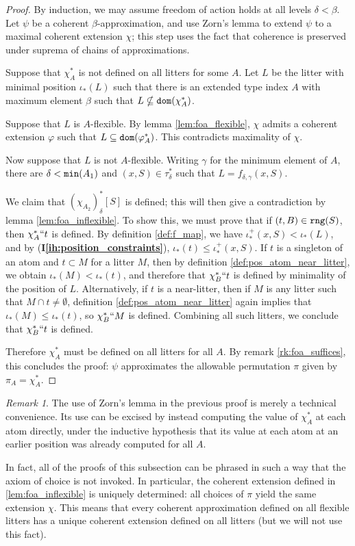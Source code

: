 \documentclass{article}
\theoremstyle{definition}
\theoremstyle{remark}
\newtheorem{remark}[theorem]{Remark}
\newcommand{\ihref}[1]{(\textbf{I\ref{#1}})}
\begin{document}
\begin{proof}
  By induction, we may assume freedom of action holds at all levels $\delta < \beta$.
  Let $\psi$ be a coherent $\beta$-approximation, and use Zorn's lemma to extend $\psi$ to a maximal coherent extension $\chi$; this step uses the fact that coherence is preserved under suprema of chains of approximations.

  Suppose that $\chi_A^*$ is not defined on all litters for some $A$.
  Let $L$ be the litter with minimal position $\iota_*(L)$ such that there is
  an extended type index $A$
  with maximum element $\beta$ such that $L \nsubseteq {\tt dom}(\chi_A^*)$.

  Suppose that $L$ is $A$-flexible.
  By lemma \ref{lem:foa_flexible}, $\chi$ admits a coherent extension $\varphi$ such that $L \subseteq {\tt dom}(\varphi_A^*)$.
  This contradicts maximality of $\chi$.

  Now suppose that $L$ is not $A$-flexible.
  Writing $\gamma$ for the minimum element of $A$, there are $\delta < {\tt min}(A_1)$ and $(x, S) \in \tau_\delta^*$ such that $L = f_{\delta,\gamma}(x, S)$.


  We claim that $(\chi_{A_2})_\delta^*[S]$ is defined; this will then give a contradiction by lemma \ref{lem:foa_inflexible}.
  To show this, we must prove that if $(t, B) \in {\tt rng}(S)$, then $\chi_A^*``t$ is defined.
  By definition \ref{def:f_map}, we have $\iota_*^+(x, S) < \iota_*(L)$, and by \ihref{ih:position_constraints}, $\iota_*(t) \leq \iota_*^+(x, S)$.
  If $t$ is a singleton of an atom and $t \subset M$ for a litter $M$, then by definition \ref{def:pos_atom_near_litter}, we obtain $\iota_*(M) < \iota_*(t)$, and therefore that $\chi_B^*``t$ is defined by minimality of the position of $L$.
  Alternatively, if $t$ is a near-litter, then if $M$ is any litter such that $M \cap t \neq \emptyset$, definition \ref{def:pos_atom_near_litter} again implies that $\iota_*(M) \leq \iota_*(t)$, so $\chi_B^*``M$ is defined.
  Combining all such litters, we conclude that $\chi_B^*``t$ is defined.

  Therefore $\chi_A^*$ must be defined on all litters for all $A$.
  By remark \ref{rk:foa_suffices}, this concludes the proof: $\psi$ approximates the allowable permutation $\pi$ given by $\pi_A = \chi_A^*$.
\end{proof}
\begin{remark}
  The use of Zorn's lemma in the previous proof is merely a technical convenience.
  Its use can be excised by instead computing the value of \( \chi_A^* \) at each atom directly, under the inductive hypothesis that its value at each atom at an earlier position was already computed for all \( A \).

  In fact, all of the proofs of this subsection can be phrased in such a way that the axiom of choice is not invoked.
  In particular, the coherent extension defined in \ref{lem:foa_inflexible} is uniquely determined: all choices of \( \pi \) yield the same extension \( \chi \).
  This means that every coherent approximation defined on all flexible litters has a unique coherent extension defined on all litters (but we will not use this fact).
\end{remark}
\end{document}

